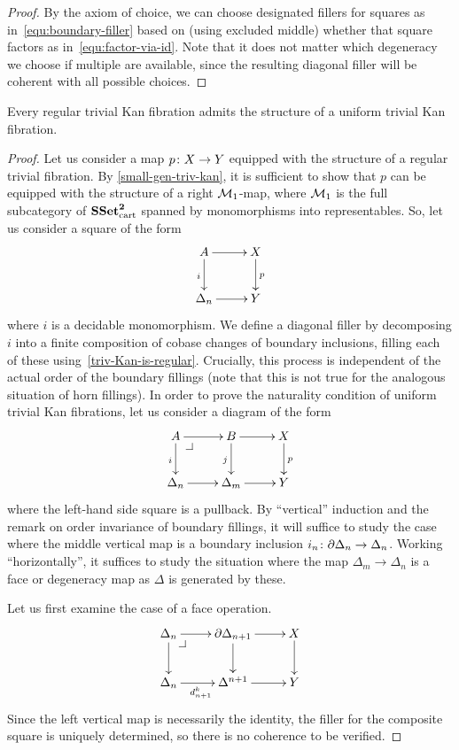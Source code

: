 \documentclass[reqno,10pt,a4paper,oneside]{amsart}
\begin{document}
\begin{proof} By the axiom of choice, we can choose  designated fillers for squares as in~\eqref{equ:boundary-filler}
 based on (using excluded middle) whether that square factors as in~\eqref{equ:factor-via-id}. Note that it does not matter which degeneracy we choose if multiple are available, since the resulting diagonal filler will be coherent with 
 all possible choices.
\end{proof} 


\begin{lemma} \label{reg-triv-is-unif-Kan}
Every regular trivial Kan fibration admits the structure of a uniform trivial Kan fibration.
\end{lemma}

\begin{proof} Let us consider a map $p \co X \to Y$ equipped with the structure of a 
regular trivial fibration. By \cref{small-gen-triv-kan}, it is sufficient to show that $p$
can be equipped with the structure of a right $\cal{M}_1$-map, where $\cal{M}_1$
is the full subcategory of $\SSet^{\mathbf{2}}_\cart$  spanned by monomorphisms into representables.
So, let us consider a square of the form
\[
\xymatrix{
A \ar[d]_i \ar[r] & X \ar[d]^p \\
\Delta_n \ar[r]  & Y }
\]
where $i$ is a decidable monomorphism. 
We define a diagonal filler by decomposing $i$ into a finite composition of cobase changes of boundary inclusions, filling each of these using~\cref{triv-Kan-is-regular}.
Crucially, this process is independent of the actual order of the boundary fillings (note that this is not true for the analogous situation of horn fillings). In order to prove the naturality condition of uniform trivial Kan fibrations, 
let us consider a diagram of the form
\[
\xymatrix{
  A
  \ar[r]
  \ar[d]_i
  \pullback{dr}
&
  B
  \ar[d]_j 
  \ar[r]
&
  X
  \ar[d]^p 
\\
  \Delta_{n}
  \ar[r]
&
  \Delta_{m}
  \ar[r]
&
  Y
}
\]
where the left-hand side square is a pullback. 
By ``vertical'' induction and the remark on order invariance of boundary fillings, it will suffice to study the case where the middle vertical map is a boundary inclusion $i_n \co \partial \Delta_n \to \Delta_n$.
Working ``horizontally'', it suffices to study the situation where the map $\Delta_{m} \to \Delta_n$ is a face or degeneracy map as $\Delta$ is generated by these.

Let us first examine the case of a face operation.
\[
\xymatrix{
  \Delta_n
  \ar[r]
  \ar[d]
  \pullback{dr}
&
  \partial \Delta_{n+1}
  \ar[d]
  \ar[r]
&
  X
  \ar[d]
\\
  \Delta_n
  \ar[r]_{d^k_{n+1}}
&
  \Delta^{n+1}
  \ar[r]
&
  Y
}
\]
Since the left vertical map is necessarily the identity, the filler for the composite square is uniquely determined, so there is no coherence to be verified.


\end{proof}
\end{document}
